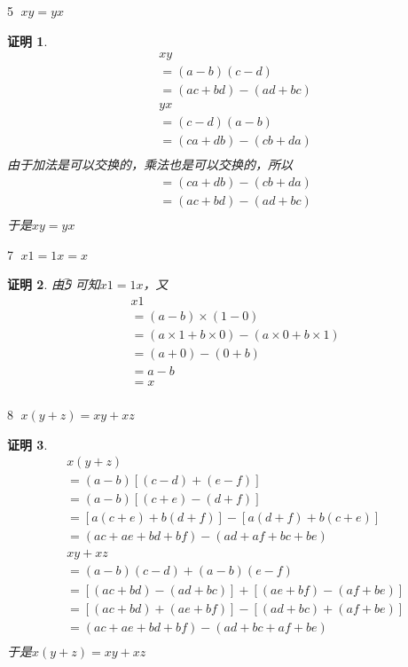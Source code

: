 \documentclass{article}
\theoremstyle{mystyle}
\theoremstyle{zproofstyle}
\newtheorem*{zproof}{证明}
\begin{document}
\textcircled{5} $xy=yx$

\begin{zproof}
  \begin{align*}
     & xy                  \\
     & = (a-b)(c-d)        \\
     & = (ac+bd) - (ad+bc) \\
     & yx                  \\
     & = (c-d)(a-b)        \\
     & = (ca+db) - (cb+da) \\
  \end{align*}
  由于加法是可以交换的，乘法也是可以交换的，所以
  \begin{align*}
     & = (ca+db) - (cb+da) \\
     & = (ac+bd) - (ad+bc) \\
  \end{align*}
  于是$xy = yx$
\end{zproof}

\textcircled{7} $x1=1x=x$

\begin{zproof}
  由\textcircled{5} 可知$x1=1x$，又
  \begin{align*}
     & x1                                                      \\
     & = (a-b) \times (1-0)                                    \\
     & = (a \times 1 + b \times 0) - (a \times 0 + b \times 1) \\
     & = (a + 0) - (0 + b)                                     \\
     & = a - b                                                 \\
     & = x                                                     \\
  \end{align*}
\end{zproof}

\textcircled{8} $x(y + z) = xy + xz$

\begin{zproof}
  \begin{align*}
     & x(y + z)                                  \\
     & = (a-b)[(c-d)+(e-f)]                      \\
     & = (a-b)[(c+e)-(d+f)]                      \\
     & = [a(c+e)+b(d+f)] - [a(d+f)+b(c+e)]       \\
     & = (ac+ae+bd+bf) - (ad+af+bc+be)           \\
     & xy + xz                                   \\
     & = (a-b)(c-d) + (a-b)(e-f)                 \\
     & = [(ac + bd)-(ad+bc)] + [(ae+bf)-(af+be)] \\
     & = [(ac + bd)+(ae+bf)] - [(ad+bc)+(af+be)] \\
     & = (ac+ae+bd+bf) - (ad+bc+af+be)           \\
  \end{align*}
  于是$x(y + z) = xy + xz$
\end{zproof}
\end{document}
